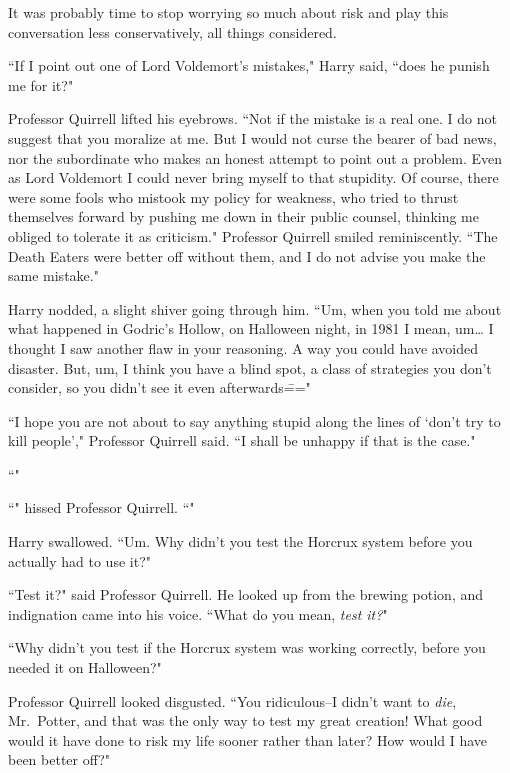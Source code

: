 It was probably time to stop worrying so much about risk and play this conversation less conservatively, all things considered.

``If I point out one of Lord Voldemort's mistakes," Harry said, ``does he punish me for it?"

Professor Quirrell lifted his eyebrows. ``Not if the mistake is a real one. I do not suggest that you moralize at me. But I would not curse the bearer of bad news, nor the subordinate who makes an honest attempt to point out a problem. Even as Lord Voldemort I could never bring myself to that stupidity. Of course, there were some fools who mistook my policy for weakness, who tried to thrust themselves forward by pushing me down in their public counsel, thinking me obliged to tolerate it as criticism." Professor Quirrell smiled reminiscently. ``The Death Eaters were better off without them, and I do not advise you make the same mistake."

Harry nodded, a slight shiver going through him. ``Um, when you told me about what happened in Godric's Hollow, on Halloween night, in 1981 I mean, um{\ldots} I thought I saw another flaw in your reasoning. A way you could have avoided disaster. But, um, I think you have a blind spot, a class of strategies you don't consider, so you didn't see it even afterwards\==="

``I hope you are not about to say anything stupid along the lines of `don't try to kill people'," Professor Quirrell said. ``I shall be unhappy if that is the case."

``"

``" hissed Professor Quirrell. ``"

Harry swallowed. ``Um. Why didn't you test the Horcrux system before you actually had to use it?"

``Test it?" said Professor Quirrell. He looked up from the brewing potion, and indignation came into his voice. ``What do you mean, \emph{test it?}"

``Why didn't you test if the Horcrux system was working correctly, before you needed it on Halloween?"

Professor Quirrell looked disgusted. ``You ridiculous\---I didn't want to \emph{die}, Mr.~Potter, and that was the only way to test my great creation! What good would it have done to risk my life sooner rather than later? How would I have been better off?"

